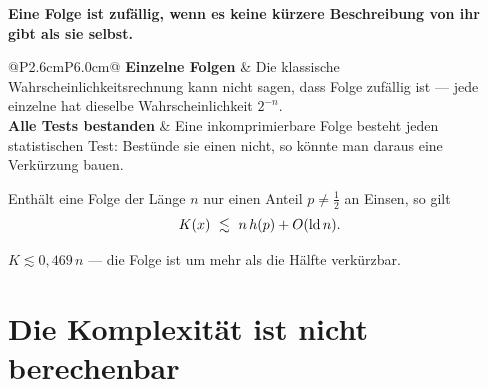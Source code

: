 \begin{merksatz}
\begin{center}
\begin{minipage}{0.9\textwidth}
\textbf{Eine Folge ist zufällig, wenn es keine kürzere Beschreibung von ihr gibt als sie selbst.}
\end{minipage}
\end{center}

\begin{center}
{\small
\renewcommand{\arraystretch}{1.5}
\begin{tabular}{@{}P{2.6cm}P{6.0cm}@{}}
\toprule
\textbf{Einzelne Folgen} & Die klassische Wahrscheinlichkeitsrechnung kann nicht sagen, dass  Folge zufällig ist --- jede einzelne hat dieselbe Wahrscheinlichkeit $2^{-n}$.\\
\textbf{Alle Tests bestanden} & Eine inkomprimierbare Folge besteht jeden statistischen Test: Bestünde sie einen nicht, so könnte man daraus eine Verkürzung bauen.\\
\bottomrule
\end{tabular}}
\end{center}

\begin{center}
\begin{minipage}{0.88\textwidth}
\end{minipage}
\end{center}

Enthält eine Folge der Länge $n$ nur einen Anteil $p \ne \frac12$ an Einsen, so gilt
\[ K(x) \ \lesssim\ n\,h(p) + O(\operatorname{ld} n) . \]

 $K \lesssim 0{,}469\,n$ --- die Folge ist um mehr als die Hälfte verkürzbar.
\end{merksatz}

\section{Die Komplexität ist nicht berechenbar}

